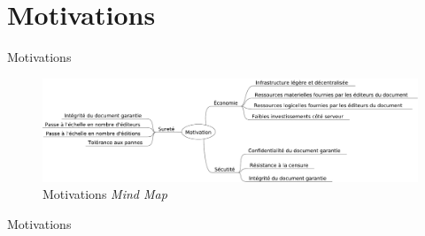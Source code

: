 \section{Motivations}
\begin{frame}{Motivations}
  \begin{figure}
    \center
    \includegraphics[width=.9\textwidth]{includes/motivations.pdf}
    \caption{Motivations \emph{Mind Map}}
  \end{figure}
\end{frame}
\begin{frame}{Motivations}
\end{frame}

